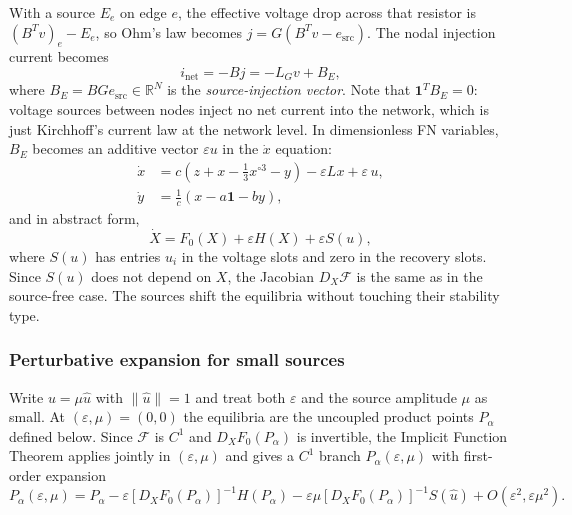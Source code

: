 \documentclass[11pt]{article}
\begin{document}
With a source $E_e$ on edge $e$, the effective voltage drop across that
resistor is $(B^Tv)_e - E_e$, so Ohm's law becomes $j = G(B^Tv -
e_{\mathrm{src}})$. The nodal injection current becomes
\begin{equation}
  i_{\mathrm{net}} = -Bj = -L_G v + B_E,
  \label{eq:net_current_with_sources}
\end{equation}
where $B_E = BGe_{\mathrm{src}} \in \mathbb{R}^N$ is the
\emph{source-injection vector}. Note that $\mathbf{1}^T B_E = 0$: voltage
sources between nodes inject no net current into the network, which is
just Kirchhoff's current law at the network level. In dimensionless FN
variables, $B_E$ becomes an additive vector $\varepsilon u$ in the
$\dot x$ equation:
\begin{align}
  \dot{x}
  &=
  c\!\left(z + x - \tfrac{1}{3}x^{\circ 3} - y\right)
  -
  \varepsilon Lx
  +
  \varepsilon\, u,
  \label{eq:eps_x_sources}\\
  \dot{y}
  &=
  \frac{1}{c}(x - a\mathbf{1} - by),
  \label{eq:eps_y_sources}
\end{align}
and in abstract form,
\begin{equation}
  \dot X = F_0(X) + \varepsilon H(X) + \varepsilon S(u),
  \label{eq:abstract_sources}
\end{equation}
where $S(u)$ has entries $u_i$ in the voltage slots and zero in the
recovery slots. Since $S(u)$ does not depend on $X$, the Jacobian
$D_X\mathcal{F}$ is the same as in the source-free case. The sources
shift the equilibria without touching their stability type.

\subsubsection*{Perturbative expansion for small sources}

Write $u = \mu\hat{u}$ with $\|\hat{u}\| = 1$ and treat both
$\varepsilon$ and the source amplitude $\mu$ as small. At
$(\varepsilon,\mu) = (0,0)$ the equilibria are the uncoupled product
points $P_\alpha$ defined below. Since $\mathcal{F}$ is $C^1$ and
$D_X F_0(P_\alpha)$ is invertible, the Implicit Function Theorem
applies jointly in $(\varepsilon,\mu)$ and gives a $C^1$ branch
$P_\alpha(\varepsilon,\mu)$ with first-order expansion
\begin{equation}
  P_\alpha(\varepsilon,\mu)
  =
  P_\alpha
  -
  \varepsilon [D_X F_0(P_\alpha)]^{-1} H(P_\alpha)
  -
  \varepsilon\mu [D_X F_0(P_\alpha)]^{-1} S(\hat{u})
  +
  O(\varepsilon^2, \varepsilon\mu^2).
  \label{eq:Palpha_full_expansion}
\end{equation}
\end{document}
